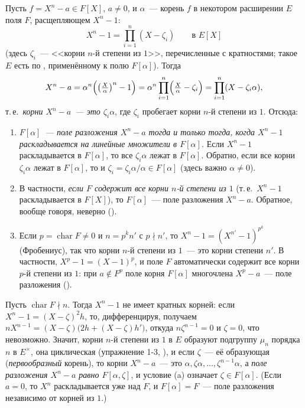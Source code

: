 \begin{example}[2.10]
Пусть $f=X^n-a\in F[X]$, $a\ne0$, и $\alpha$~--- корень $f$ в некотором расширении $E$ поля $F$, расщепляющем $X^n-1$:
\[
X^n-1=\prod_{i=1}^n(X-\zeta_i)\qquad\text{в }E[X]
\]
(здесь $\zeta_i$~--- <<корни $n$-й степени из $1$>>, перечисленные с кратностями; такое $E$ есть по ,
применённому к полю $F[\alpha]$). Тогда
\[
X^n-a=\alpha^n\Bigl(\bigl(\tfrac X\alpha\bigr)^n-1\Bigr)=\alpha^n\prod_{i=1}^n\Bigl(\tfrac X\alpha-\zeta_i\Bigr)=\prod_{i=1}^n(X-\zeta_i\alpha),
\]
т.\,е.\ \emph{корни $X^n-a$~--- это $\zeta_i\alpha$}, где $\zeta_i$ пробегает корни $n$-й степени из $1$. Отсюда:
\begin{enumerate}[label=\textup{(\alph*)}]
\item \emph{$F[\alpha]$~--- поле разложения $X^n-a$ тогда и только тогда, когда $X^n-1$ раскладывается на линейные
множители в $F[\alpha]$.} Если $X^n-1$ раскладывается в $F[\alpha]$, то все $\zeta_i\alpha$ лежат в $F[\alpha]$. Обратно,
если все корни $\zeta_i\alpha$ лежат в $F[\alpha]$, то и $\zeta_i=\zeta_i\alpha/\alpha\in F[\alpha]$ (здесь важно $\alpha\ne0$).
\item В частности, \emph{если $F$ содержит все корни $n$-й степени из $1$} (т.\,е.\ $X^n-1$ раскладывается в $F[X]$), то
$F[\alpha]$~--- поле разложения $X^n-a$. Обратное, вообще говоря, неверно ().
\item Если $p=\operatorname{char}F\ne0$ и $n=p^kn'$ с $p\nmid n'$, то $X^n-1=(X^{n'}-1)^{p^k}$ (Фробениус), так что корни
$n$-й степени из $1$~--- это корни степени $n'$. В частности, $X^p-1=(X-1)^p$, и поле $F$ автоматически содержит все
корни $p$-й степени из $1$: при $a\notin F^p$ поле корня $F[\alpha]$ многочлена $X^p-a$~--- поле разложения ().
\end{enumerate}
Пусть $\operatorname{char}F\nmid n$. Тогда $X^n-1$ не имеет кратных корней: если $X^n-1=(X-\zeta)^2h$, то, дифференцируя,
получаем $nX^{n-1}=(X-\zeta)\bigl(2h+(X-\zeta)h'\bigr)$, откуда $n\zeta^{n-1}=0$ и $\zeta=0$, что невозможно. Значит, корни
$n$-й степени из $1$ в $E$ образуют подгруппу $\mu_n$ порядка $n$ в $E^\times$, она циклическая (упражнение 1-3, ),
и если $\zeta$~--- её образующая (\emph{первообразный} корень), то корни $X^n-a$~--- это $\alpha,\zeta\alpha,\dots,\zeta^{n-1}\alpha$, а
\emph{поле разложения $X^n-a$ равно $F[\alpha,\zeta]$}, и условие (a) означает $\zeta\in F[\alpha]$. (Если $a=0$, то
$X^n$ раскладывается уже над $F$, и $F[\alpha]=F$~--- поле разложения независимо от корней из $1$.)
\end{example}

